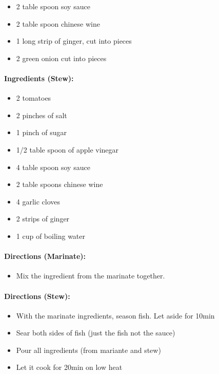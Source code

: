 \documentclass{article}
\begin{document}
\begin{itemize}
	\item 2 table spoon soy sauce
	\item 2 table spoon chinese wine
	\item 1 long strip of ginger, cut into pieces
	\item 2 green onion cut into pieces
\end{itemize}

\paragraph{Ingredients (Stew):}

\begin{itemize}
	\item 2 tomatoes
	\item 2 pinches of salt
	\item 1 pinch of sugar
	\item 1/2 table spoon of apple vinegar
	\item 4 table spoon soy sauce
	\item 2 table spoons chinese wine
	\item 4 garlic cloves
	\item 2 strips of ginger
	\item 1 cup of boiling water
\end{itemize}

\paragraph{Directions (Marinate):}
\begin{itemize}
	\item Mix the ingredient from the marinate together.
\end{itemize}


\paragraph{Directions (Stew):}
\begin{itemize}
	\item With the marinate ingredients, season fish. Let aside for 10min
	\item Sear both sides of fish (just the fish not the sauce)
	\item Pour all ingredients (from mariante and stew)
	\item Let it cook for 20min on low heat
\end{itemize}
\end{document}
